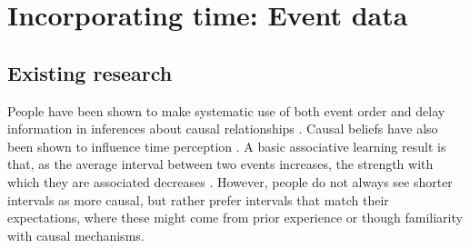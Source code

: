 \documentclass{cambridge7A}%
\begin{document}

\section{Incorporating time: Event data}\label{section:DN}

\subsection{Existing research}

People have been shown to make systematic use of both event order \citep{bramley2014order} and delay information in inferences about causal relationships \citep{buehner2003rethinking,buehner2004abolishing,buehner2006temporal}. Causal beliefs have also been shown to influence time perception \citep{bechlivanidis2013does,buehner2009causal,haggard2002voluntary}.  A basic associative learning result is that, as the average interval between two events increases, the strength with which they are associated decreases \citep{wolfe1921effect,shanks1987associative, grice1948relation}.  However, people do not always see shorter intervals as more causal, but rather prefer intervals that match their expectations, where these might come from prior experience or though familiarity with causal mechanisms.  
\end{document}
